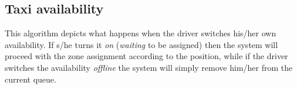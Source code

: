 \documentclass[a4paper,11pt]{report} %
\begin{document}
	\subsection{Taxi availability}
	This algorithm depicts what happens when the driver switches his/her own availability. If s/he turns it \textit{on} (\textit{waiting} to be assigned) then the system will proceed with the zone assignment according to the position, while if the driver switches the availability \textit{offline} the system will simply remove him/her from the current queue.\\
	
	\begin{minipage}{\linewidth}
	\end{minipage}		
	
\end{document}
